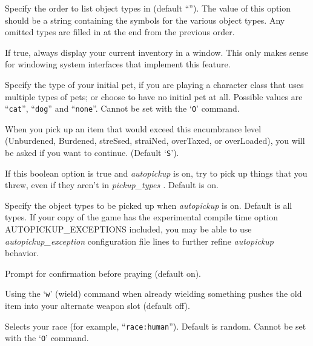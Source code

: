 \item[\ib{packorder}]
Specify the order to list object types in (default ``\Symbol{")[\%?+!=/(*`0\_}'').
The value of this option should be a string containing the
symbols for the various object types.  Any omitted types are filled in
at the end from the previous order.

\item[\ib{perm\_invent}]
If true, always display your current inventory in a window.  This only
makes sense for windowing system interfaces that implement this feature.

\item[\ib{pettype}]
Specify the type of your initial pet, if you are playing a character class
that uses multiple types of pets; or choose to have no initial pet at all.
Possible values are ``{\tt cat}'', ``{\tt dog}'' and ``{\tt none}''.
Cannot be set with the `{\tt O}' command.

\item[\ib{pickup\_burden}]
When you pick up an item that would exceed this encumbrance
level (Unburdened, Burdened, streSsed, straiNed, overTaxed,
or overLoaded), you will be asked if you want to continue.
(Default `{\tt S}').

\item[\ib{pickup\_thrown}]
If this boolean option is true and
{\it autopickup\/} 
is on, try to pick up things that you threw, even if they aren't in
{\it pickup_types .\/} 
Default is on.

\item[\ib{pickup\_types}]
Specify the object types to be picked up when
{\it autopickup\/} 
is on.  Default is all types.  If your copy of the game has the experimental
compile time option AUTOPICKUP\_EXCEPTIONS included, you may be able to use 
{\it autopickup_exception\/} 
configuration file lines to further refine
{\it autopickup\/} 
behavior.

\item[\ib{prayconfirm}]
Prompt for confirmation before praying (default on).

\item[\ib{pushweapon}]
Using the `{\tt w}' (wield) command when already wielding
something pushes the old item into your alternate weapon slot (default off).

\item[\ib{race}]
Selects your race (for example, ``{\tt race:human}'').  Default is random.
Cannot be set with the `{\tt O}' command.

